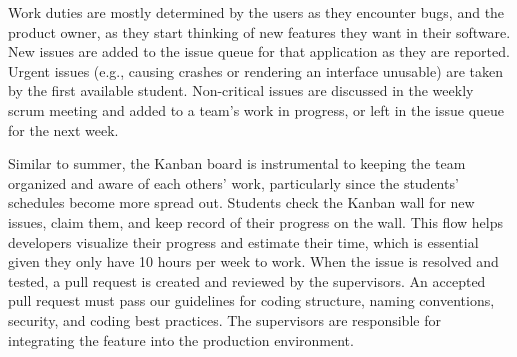 Work duties are mostly determined by the users as they encounter bugs, and the product owner, as they start thinking of new features they want in their software. New issues are added to the issue queue for that application as they are reported. Urgent issues (e.g., causing crashes or rendering an interface unusable) are taken by the first available student. Non-critical issues are discussed in the weekly scrum meeting and added to a team’s work in progress, or left in the issue queue for the next week.


Similar to summer, the Kanban board is instrumental to keeping the team organized and aware of each others' work, particularly since the students' schedules become more spread out. Students check the Kanban wall for new issues, claim them, and keep record of their progress on the wall. This flow helps developers visualize their progress and estimate their time, which is essential given they only have 10 hours per week to work. When the issue is resolved and tested, a pull request is created and reviewed by the supervisors. An accepted pull request must pass our guidelines for coding structure, naming conventions, security, and coding best practices. The supervisors are responsible for integrating the feature into the production environment.





